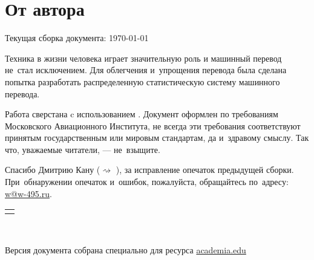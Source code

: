 
\section*{От автора}

\begin{flushright}
	{\magic Текущая сборка документа: \today \ \thistime \\}
\end{flushright}
Техника в жизни человека играет значительную роль 
и машинный перевод не~стал исключением. 
Для облегчения и~упрощения перевода 
была сделана попытка разработать 
распределенную статистическую систему машинного перевода.

Работа сверстана c использованием {\comic \XeLaTeX}.
Документ оформлен по требованиям Московского Авиационного Института,
не всегда эти требования соответствуют принятым государственным или мировым стандартам,
да и~здравому смыслу. Так что, уважаемые читатели, --- не~взыщите.

Спасибо Дмитрию Кану ($\rightsquigarrow$ \cite{Кан:2011}), за исправление опечаток предыдущей сборки.
При~обнаружении опечаток и~ошибок, пожалуйста, обращайтесь по~адресу: 
\href{mailto:w@w-495.ru}{{\color{teal} w@w-495.ru}}.\\

\begin{center}
	\vspace{12pt}
	\begin{tabular}{p{7cm}}
		\hline \\
	\end{tabular}\\
	\vspace{12pt}
\end{center}
{\libertine
	Версия документа собрана специально для
	ресурса \href{http://mai.academia.edu}{academia.edu}
	
}

\pagebreak

